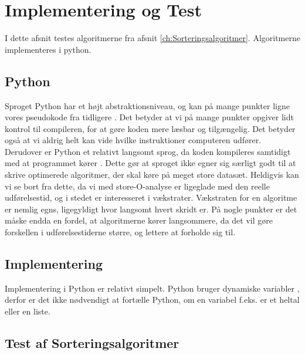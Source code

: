 \chapter{Implementering og Test}
\label{ch:Implementering og test af Algoritmerne}

I dette afsnit testes algoritmerne fra afsnit \ref{ch:Sorteringsalgoritmer}. Algoritmerne implementeres i python.

\section{Python}
\label{sec:Python}

Sproget Python har et højt abstraktionsniveau, og kan på mange punkter ligne vores pseudokode fra tidligere \cite[s. 68]{aogd}. Det betyder at vi på mange punkter opgiver lidt kontrol til compileren, for at gøre koden mere læsbar og tilgængelig. Det betyder også at vi aldrig helt kan vide hvilke instruktioner computeren udfører. Derudover er Python et relativt langsomt sprog, da koden kompileres samtidigt med at programmet kører \cite{what-is-python}. Dette gør at sproget ikke egner sig særligt godt til at skrive optimerede algoritmer, der skal køre på meget store datasæt. Heldigvis kan vi se bort fra dette, da vi med store-O-analyse er ligeglade med den reelle udførelsestid, og i stedet er interesseret i vækstrater. Vækstraten for en algoritme er nemlig egns, ligegyldigt hvor langsomt hvert skridt er. På nogle punkter er det måske endda en fordel, at algoritmerne kører langsommere, da det vil gøre forskellen i udførelsestiderne større, og lettere at forholde sig til. 


\section{Implementering}
\label{sec:Implementering}

Implementering i Python er relativt simpelt. Python bruger dynamiske variabler \cite{what-is-python}, derfor er det ikke nødvendigt at fortælle Python, om en variabel f.eks. er et heltal eller en liste. 


\section{Test af Sorteringsalgoritmer}
\label{sec:Test af Sorteringsalgoritmer}

